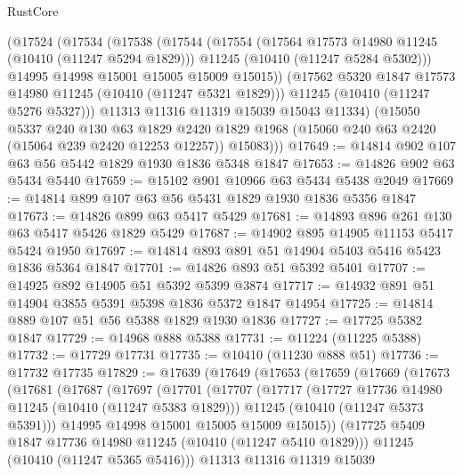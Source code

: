 \begin{lexlean}{RustCore}
\begin{coremodule}
        (@17524
          (@17534
            (@17538
              (@17544
                (@17554
                  (@17564 @17573 @14980 @11245 (@10410 (@11247 @5294 @1829)))
                  @11245
                  (@10410 (@11247 @5284 @5302)))
                @14995
                @14998
                @15001
                @15005
                @15009
                @15015))
            (@17562 @5320 @1847 @17573 @14980 @11245 (@10410 (@11247 @5321 @1829)))
            @11245
            (@10410 (@11247 @5276 @5327)))
          @11313
          @11316
          @11319
          @15039
          @15043
          @11334)
        (@15050
          @5337
          @240
          @130
          @63
          @1829
          @2420
          @1829
          @1968
          (@15060 @240 @63 @2420 (@15064 @239 @2420 @12253 @12257))
          @15083)))
@17649 := @14814 @902 @107 @63 @56 @5442 @1829 @1930 @1836 @5348 @1847
@17653 := @14826 @902 @63 @5434 @5440
@17659 := @15102 @901 @10966 @63 @5434 @5438 @2049
@17669 := @14814 @899 @107 @63 @56 @5431 @1829 @1930 @1836 @5356 @1847
@17673 := @14826 @899 @63 @5417 @5429
@17681 := @14893 @896 @261 @130 @63 @5417 @5426 @1829 @5429
@17687 := @14902 @895 @14905 @11153 @5417 @5424 @1950
@17697 := @14814 @893 @891 @51 @14904 @5403 @5416 @5423 @1836 @5364 @1847
@17701 := @14826 @893 @51 @5392 @5401
@17707 := @14925 @892 @14905 @51 @5392 @5399 @3874
@17717 := @14932 @891 @51 @14904 @3855 @5391 @5398 @1836 @5372 @1847 @14954
@17725 := @14814 @889 @107 @51 @56 @5388 @1829 @1930 @1836
@17727 := @17725 @5382 @1847
@17729 := @14968 @888 @5388
@17731 := @11224 (@11225 @5388)
@17732 := @17729 @17731
@17735 := @10410 (@11230 @888 @51)
@17736 := @17732 @17735
@17829 := @17639
    (@17649
      (@17653
        (@17659
          (@17669
            (@17673
              (@17681
                (@17687
                  (@17697
                    (@17701
                      (@17707
                        (@17717
                          (@17727 @17736 @14980 @11245 (@10410 (@11247 @5383 @1829)))
                          @11245
                          (@10410 (@11247 @5373 @5391)))
                        @14995
                        @14998
                        @15001
                        @15005
                        @15009
                        @15015))
                    (@17725 @5409 @1847 @17736 @14980 @11245 (@10410 (@11247 @5410 @1829)))
                    @11245
                    (@10410 (@11247 @5365 @5416)))
                  @11313
                  @11316
                  @11319
                  @15039

\end{coremodule}
\end{lexlean}
